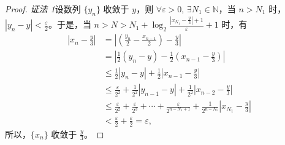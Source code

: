 \begin{proof}
\textit{证法 1}\quad 设数列 $\{y_n\}$ 收敛于 $y$，则 $\forall \varepsilon > 0$, $\exists N_1 \in \mathbb{N}$，当 $n > N_1$ 时，$|y_n - y| < \frac{\varepsilon}{2}$。于是，当 $n > N > N_1 + \log_2 \frac{\left|x_{N_1} - \frac{y}{3}\right| + 1}{\varepsilon} + 1$ 时，有
\begin{align*}
\left|x_n - \frac{y}{3}\right| &= \left|\left(\frac{y_n}{2} - \frac{x_{n-1}}{2}\right) - \frac{y}{3}\right|\\
&= \left|\frac{1}{2}(y_n - y) - \frac{1}{2}\left(x_{n-1} - \frac{y}{3}\right)\right|\\
&\leqslant \frac{1}{2}|y_n - y| + \frac{1}{2}\left|x_{n-1} - \frac{y}{3}\right|\\
&\leqslant \frac{\varepsilon}{2^2} + \frac{1}{2^2}|y_{n-1} - y| + \frac{1}{2^2}\left|x_{n-2} - \frac{y}{3}\right|\\
&\leqslant \frac{\varepsilon}{2^2} + \frac{\varepsilon}{2^3} + \cdots + \frac{\varepsilon}{2^{n-N_1+1}} + \frac{1}{2^{n-N_1}}\left|x_{N_1} - \frac{y}{3}\right|\\
&< \frac{\varepsilon}{2} + \frac{\varepsilon}{2} = \varepsilon,
\end{align*}
所以，$\{x_n\}$ 收敛于 $\frac{y}{3}$。


\end{proof}
